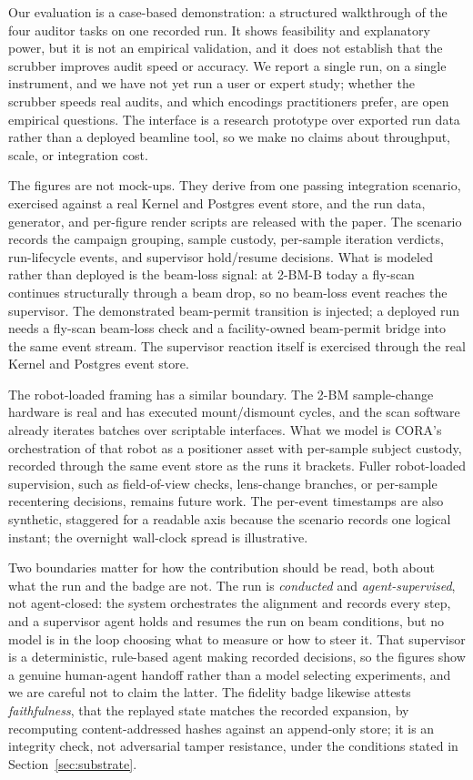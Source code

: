 Our evaluation is a case-based demonstration: a structured walkthrough of the
four auditor tasks on one recorded run. It shows feasibility and explanatory
power, but it is not an empirical validation, and it does not establish that the
scrubber improves audit speed or accuracy. We report a single run, on a single
instrument, and we have not yet run a user or expert study; whether the scrubber
speeds real audits, and which encodings practitioners prefer, are open empirical
questions. The interface is a research prototype over exported run data rather
than a deployed beamline tool, so we make no claims about throughput, scale, or
integration cost.

The figures are not mock-ups. They derive from one passing integration
scenario, exercised against a real Kernel and Postgres event store, and the run
data, generator, and per-figure render scripts are released with the paper. The
scenario records the campaign grouping, sample custody, per-sample iteration
verdicts, run-lifecycle events, and supervisor hold/resume decisions. What is
modeled rather than deployed is the beam-loss signal: at 2-BM-B today a fly-scan
continues structurally through a beam drop, so no beam-loss event reaches the
supervisor. The demonstrated beam-permit transition is injected; a deployed run
needs a fly-scan beam-loss check and a facility-owned beam-permit bridge into the
same event stream. The supervisor reaction itself is exercised through the real
Kernel and Postgres event store.

The robot-loaded framing has a similar boundary. The 2-BM sample-change hardware
is real and has executed mount/dismount cycles, and the scan software already
iterates batches over scriptable interfaces. What we model is CORA's
orchestration of that robot as a positioner asset with per-sample subject
custody, recorded through the same event store as the runs it brackets. Fuller
robot-loaded supervision, such as field-of-view checks, lens-change branches, or
per-sample recentering decisions, remains future work. The per-event timestamps
are also synthetic, staggered for a readable axis because the scenario records
one logical instant; the overnight wall-clock spread is illustrative.

Two boundaries matter for how the contribution should be read, both about what
the run and the badge are not. The run is
\emph{conducted} and \emph{agent-supervised}, not agent-closed: the system
orchestrates the alignment and records every step, and a supervisor agent holds
and resumes the run on beam conditions, but no model is in the loop choosing what
to measure or how to steer it. That
supervisor is a deterministic, rule-based agent making recorded decisions, so
the figures show a genuine human-agent handoff rather than a model selecting
experiments, and we are careful not to claim the latter. The fidelity badge
likewise attests \emph{faithfulness}, that the replayed state matches the
recorded expansion, by recomputing content-addressed hashes against an
append-only store; it is an integrity check, not adversarial tamper resistance,
under the conditions stated in Section~\ref{sec:substrate}.

